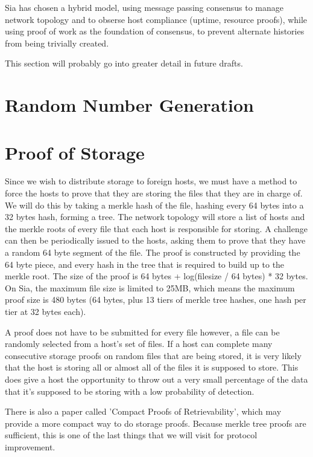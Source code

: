 \documentclass[twocolumn]{article}
\begin{document}
Sia has chosen a hybrid model, using message passing consensus to manage network topology and to obserse host compliance (uptime, resource proofs), while using proof of work as the foundation of consensus, to prevent alternate histories from being trivially created.

This section will probably go into greater detail in future drafts.

\section{Random Number Generation}

\section{Proof of Storage}
Since we wish to distribute storage to foreign hosts, we must have a method to force the hosts to prove that they are storing the files that they are in charge of.
We will do this by taking a merkle hash of the file, hashing every 64 bytes into a 32 bytes hash, forming a tree.
The network topology will store a list of hosts and the merkle roots of every file that each host is responsible for storing.
A challenge can then be periodically issued to the hosts, asking them to prove that they have a random 64 byte segment of the file.
The proof is constructed by providing the 64 byte piece, and every hash in the tree that is required to build up to the merkle root.
The size of the proof is 64 bytes + log(filesize / 64 bytes) * 32 bytes.
On Sia, the maximum file size is limited to 25MB, which means the maximum proof size is 480 bytes (64 bytes, plus 13 tiers of merkle tree hashes, one hash per tier at 32 bytes each).

A proof does not have to be submitted for every file however, a file can be randomly selected from a host's set of files.
If a host can complete many consecutive storage proofs on random files that are being stored, it is very likely that the host is storing all or almost all of the files it is supposed to store.
This does give a host the opportunity to throw out a very small percentage of the data that it's supposed to be storing with a low probability of detection.

There is also a paper called 'Compact Proofs of Retrievability', which may provide a more compact way to do storage proofs.
Because merkle tree proofs are sufficient, this is one of the last things that we will visit for protocol improvement.
\end{document}
